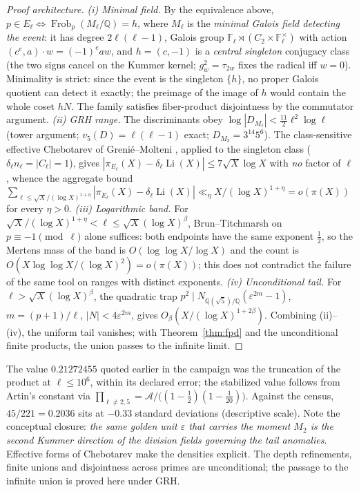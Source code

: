 \documentclass[11pt]{amsart}
\theoremstyle{definition}
\theoremstyle{remark}
\newcommand{\F}{\mathbb{F}}
\newcommand{\Q}{\mathbb{Q}}
\newcommand{\eps}{\varepsilon}
\begin{document}
\begin{proof}[Proof architecture]
\emph{(i) Minimal field.} By the equivalence above,
$p \in E_\ell \iff \operatorname{Frob}_p(M_\ell/\Q) = h$, where $M_\ell$
is the \emph{minimal Galois field detecting the event}: it has degree
$2\ell(\ell-1)$, Galois group $\F_\ell \rtimes (C_2 \times
\F_\ell^\times)$ with action $(c^e, a)\cdot w = (-1)^e a w$, and
$h = (c, -1)$ is a \emph{central singleton} conjugacy class (the two
signs cancel on the Kummer kernel; $g_w^2 = \tau_{2w}$ fixes the radical
iff $w = 0$). Minimality is strict: since the event is the singleton
$\{h\}$, no proper Galois quotient can detect it exactly; the
preimage of the image of $h$ would contain the whole coset $hN$. The
family satisfies fiber-product disjointness by the commutator argument.
\emph{(ii) GRH range.} The discriminants obey
$\log|D_{M_\ell}| < \tfrac{11}{2}\ell^2\log\ell$ (tower argument;
$v_5(D) = \ell(\ell-1)$ exact; $D_{M_3} = 3^{14}5^6$). The
class-sensitive effective Chebotarev of Greni\'e--Molteni \cite{GM},
applied to the singleton class ($\delta_\ell n_\ell = |C_\ell| = 1$),
gives $|\pi_{E_\ell}(X) - \delta_\ell\operatorname{Li}(X)| \le
7\sqrt X\log X$ with \emph{no} factor of $\ell$, whence the aggregate
bound $\sum_{\ell \le \sqrt X/(\log X)^{1+\eta}} |\pi_{E_\ell}(X) -
\delta_\ell \operatorname{Li}(X)| \ll_\eta X/(\log X)^{1+\eta} =
o(\pi(X))$ for every $\eta > 0$.
\emph{(iii) Logarithmic band.} For
$\sqrt X/(\log X)^{1+\eta} < \ell \le \sqrt X(\log X)^\beta$,
Brun--Titchmarsh on $p \equiv -1 \pmod\ell$ alone suffices: both
endpoints have the same exponent $\tfrac12$, so the Mertens mass of the
band is $O(\log\log X/\log X)$ and the count is
$O(X\log\log X/(\log X)^2) = o(\pi(X))$; this does not contradict
the failure of the same tool on ranges with distinct exponents.
\emph{(iv) Unconditional tail.} For $\ell > \sqrt X(\log X)^\beta$, the
quadratic trap $p^2 \mid N_{\Q(\sqrt5)/\Q}(\eps^{2m}-1)$,
$m = (p+1)/\ell$, $|N| < 4\eps^{2m}$, gives
$O_\beta(X/(\log X)^{1+2\beta})$.
Combining (ii)--(iv), the uniform tail vanishes; with
Theorem~\ref{thm:fpd} and the unconditional finite products, the union
passes to the infinite limit.
\end{proof}

The value $0.21272455$ quoted earlier in the campaign was the truncation
of the product at $\ell \le 10^6$, within its declared error; the
stabilized value follows from Artin's constant via
$\prod_{\ell\ne2,5} = \mathcal A / \big((1-\tfrac12)(1-\tfrac1{20})\big)$.
Against the census, $45/221 = 0.2036$ sits at $-0.33$ standard
deviations (descriptive scale). Note the
conceptual closure: \emph{the same golden unit $\eps$ that carries the
moment $M_2$ is the second Kummer direction of the division fields
governing the tail anomalies}. Effective forms of Chebotarev
\cite{KW2021} make the densities explicit. The depth refinements, finite
unions and disjointness across primes are unconditional; the passage to
the infinite union is proved here under GRH.
\end{document}
